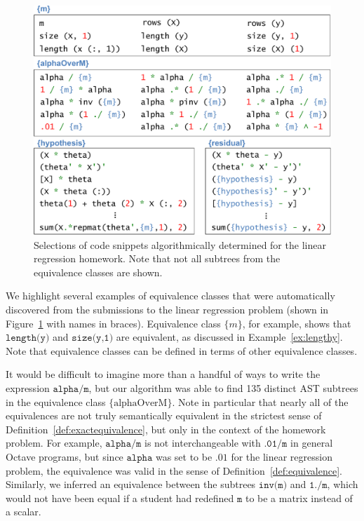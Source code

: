 \begin{figure}[t!]
\center
\includegraphics[width=.68\textwidth]{img/equivalencesAll.pdf}

\caption[Resulting equivalence classes]{
 Selections of code snippets algorithmically determined for the linear regression homework.  Note that not all subtrees from the equivalence classes are shown.
}
\label{fig:equivalences}
\end{figure}


We highlight several examples of equivalence classes that were automatically discovered from the 
submissions to the linear regression problem (shown in Figure~\ref{fig:equivalences} with names in braces).  
Equivalence class $\{m\}$, for example, shows that $\texttt{length(y)}$ and $\texttt{size(y,1)}$ are equivalent, as discussed in Example~\ref{ex:lengthy}.
Note that equivalence classes can be defined in terms of other equivalence classes.

It would be difficult to imagine more than a handful of ways to write the expression $\texttt{alpha/m}$, 
but our algorithm was able to find 135 distinct AST subtrees in the equivalence class $\{\mbox{alphaOverM}\}$.
Note in particular that nearly all of the equivalences 
are not truly semantically equivalent in the strictest sense of Definition~\ref{def:exactequivalence}, but only
in the context of the homework problem.   For example, $\texttt{alpha/m}$ is not interchangeable
with $\texttt{.01/m}$ in general Octave programs, but since $\texttt{alpha}$ was set to be $.01$ for the linear
regression problem, the equivalence was valid in the sense of Definition~\ref{def:equivalence}.
Similarly, we inferred an equivalence between the subtrees $\texttt{inv(m)}$ and $\texttt{1./m}$, which would 
not have been equal if a student had redefined $\texttt{m}$ to be a matrix instead of a scalar.

